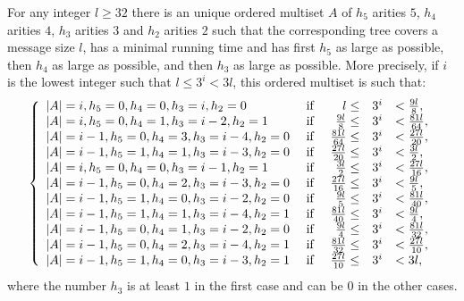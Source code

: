 \documentclass{llncs}
\begin{document}
\begin{theorem}\label{min_running_time_max_arities}
For any integer $l \geq 32$ there is an unique ordered multiset $A$
of $h_5$ arities $5$, $h_4$ arities $4$, $h_3$ arities $3$ and $h_2$ arities $2$
such that the corresponding tree covers a message size $l$, has a minimal running time
and has first $h_5$ as large as possible, then $h_4$ as large as possible, and then 
$h_3$ as large as possible.
More precisely, if $i$ is the lowest integer such that $l \leq 3^i < 3l$, 
this ordered multiset is such that:
\[
\left\{
\begin{array}{llrll}
|A|=i,    h_5=0,  h_4=0,  h_3=i,    h_2=0  & \hbox{ if } & l \leq & 3^i & < \frac{9l}{8}, \\
|A|=i,    h_5=0,  h_4=1,  h_3=i-2,  h_2=1 & \hbox{ if } & \frac{9l}{8} \leq & 3^i & < \frac{81l}{64}, \\
|A|=i-1,  h_5=0,  h_4=3,  h_3=i-4,  h_2=0 & \hbox{ if } & \frac{81l}{64} \leq & 3^i & < \frac{27l}{20}, \\
|A|=i-1,  h_5=1,  h_4=1,  h_3=i-3,  h_2=0 & \hbox{ if } & \frac{27l}{20} \leq & 3^i & < \frac{3l}{2}, \\
|A|=i,    h_5=0,  h_4=0,  h_3=i-1,  h_2=1 & \hbox{ if } & \frac{3l}{2} \leq & 3^i & < \frac{27l}{16}, \\
|A|=i-1,  h_5=0,  h_4=2,  h_3=i-3,  h_2=0 & \hbox{ if } & \frac{27l}{16} \leq & 3^i & < \frac{9l}{5}, \\
|A|=i-1,  h_5=1,  h_4=0,  h_3=i-2,  h_2=0 & \hbox{ if } & \frac{9l}{5} \leq & 3^i & < \frac{81l}{40}, \\
|A|=i-1,  h_5=1,  h_4=1,  h_3=i-4,  h_2=1 & \hbox{ if } & \frac{81l}{40} \leq & 3^i & < \frac{9l}{4}, \\
|A|=i-1,  h_5=0,  h_4=1,  h_3=i-2,  h_2=0 & \hbox{ if } & \frac{9l}{4} \leq & 3^i & < \frac{81l}{32}, \\
|A|=i-1,  h_5=0,  h_4=2,  h_3=i-4,  h_2=1 & \hbox{ if } & \frac{81l}{32} \leq & 3^i & < \frac{27l}{10}, \\
|A|=i-1,  h_5=1,  h_4=0,  h_3=i-3,  h_2=1 & \hbox{ if } & \frac{27l}{10} \leq & 3^i & < 3l, \\
\end{array}
\right .
\]
where the number $h_3$ is at least $1$ in the first case and can be $0$ in the other cases. 
\end{theorem}
\end{document}
